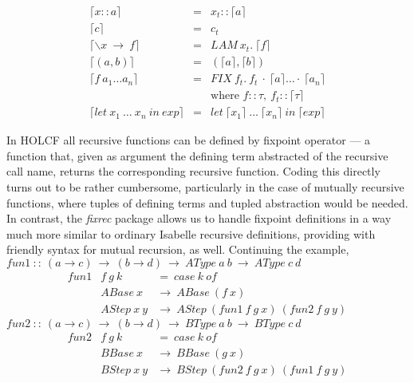 \documentclass[a4paper,12pt]{article}
\begin{document}
$$\begin{array}{lcl} 
  \lceil x::a \rceil & = & x_{t}::\lceil a \rceil \\
  \lceil c \rceil & = & c_{t} \\
  \lceil \backslash x \ \to \ f \rceil & = & LAM \ x_{t}. \ \lceil f \rceil \\
  \lceil (a,b) \rceil & = & (\lceil a \rceil, \lceil b \rceil) \\
  \lceil f \ a_{1} \ldots a_{n} \rceil & = & FIX \ f_{t}. \ f_{t} \ \cdot \ 
  \lceil a \rceil \ldots \cdot \ \lceil a_{n} \rceil \\
  & & \mbox{where } f::\tau, \ f_{t}::\lceil \tau \rceil \\
  \lceil let \ x_{1} \ \dots \ x_{n} \ in \ exp \rceil & = 
         & let \ \lceil x_{1} \rceil \ \dots \ \lceil x_{n} \rceil \ in \ \lceil exp \rceil
\end{array}$$

\noindent In HOLCF all recursive functions can be defined by fixpoint
operator --- a function that, given as argument the defining term
abstracted of the recursive call name, returns the corresponding
recursive function.  Coding this directly turns out to be rather
cumbersome, particularly in the case of mutually recursive functions,
where tuples of defining terms and tupled abstraction would be needed.
In contrast, the \emph{fixrec} package allows us to handle fixpoint
definitions in a way much more similar to ordinary Isabelle recursive
definitions, providing with friendly syntax for mutual recursion,
as well. Continuing the example,\\

\noindent $ fun1 \ :: \ (a \to c) \ \to \ (b \to d) \
\to \ AType \ a \ b \ \to \ AType \ c \ d $ 
$$\begin{array}{lll}
  fun1 & f \ g \ k  & = \ case \ k \ of \\
  & ABase \ x & \to \ ABase \ (f \ x) \\
  & AStep \ x \ y & \to \ AStep \ (fun1 \ f \ g \ x) \ (fun2 \ f \ g \
  y)
\end{array} $$
$ fun2 \ :: \ (a \to c) \ \to \ (b \to d) \ \to \ BType \ a \ b \ \to \ BType \ c \ d $
$$\begin{array}{lll}
  fun2 & f \ g \ k & = \ case \ k \ of \\
  & BBase \ x & \to \ BBase \ (g \ x) \\
  & BStep \ x \ y & \to \ BStep \ (fun2 \ f \ g \ x) \ (fun1 \ f \ g \ y)
\end{array} $$ 
\end{document}
